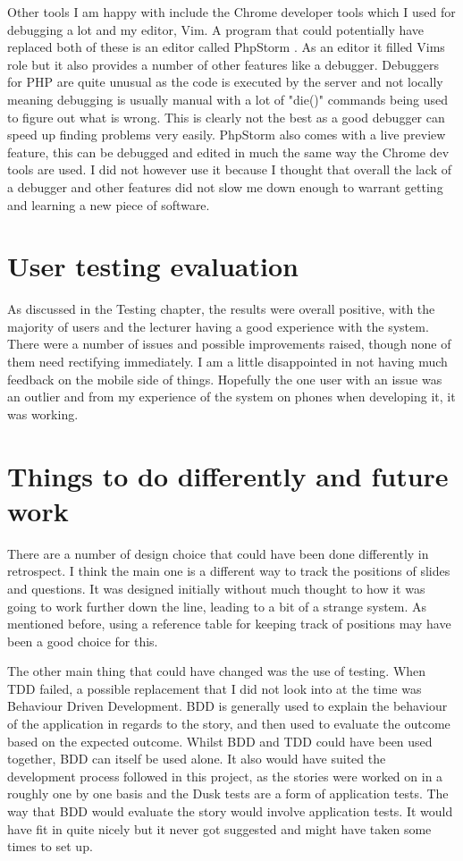 Other tools I am happy with include the Chrome developer tools which I used for debugging a lot and my editor, Vim. A program that could potentially have replaced both of these is an editor called PhpStorm \cite{phpstorm}. As an editor it filled Vims role but it also provides a number of other features like a debugger. Debuggers for PHP are quite unusual as the code is executed by the server and not locally meaning debugging is usually manual with a lot of "die()" commands being used to figure out what is wrong. This is clearly not the best as a good debugger can speed up finding problems very easily. PhpStorm also comes with a live preview feature, this can be debugged and edited in much the same way the Chrome dev tools are used. I did not however use it because I thought that overall the lack of a debugger and other features did not slow me down enough to warrant getting and learning a new piece of software.

\section{User testing evaluation}
As discussed in the Testing chapter, the results were overall positive, with the majority of users and the lecturer having a good experience with the system. There were a number of issues and possible improvements raised, though none of them need rectifying immediately. I am a little disappointed in not having much feedback on the mobile side of things. Hopefully the one user with an issue was an outlier and from my experience of the system on phones when developing it, it was working.

\section{Things to do differently and future work}
There are a number of design choice that could have been done differently in retrospect. I think the main one is a different way to track the positions of slides and questions. It was designed initially without much thought to how it was going to work further down the line, leading to a bit of a strange system. As mentioned before, using a reference table for keeping track of positions may have been a good choice for this.

The other main thing that could have changed was the use of testing. When TDD failed, a possible replacement that I did not look into at the time was Behaviour Driven Development\cite{bdd}. BDD is generally used to explain the behaviour of the application in regards to the story, and then used to evaluate the outcome based on the expected outcome. Whilst BDD and TDD could have been used together, BDD can itself be used alone. It also would have suited the development process followed in this project, as the stories were worked on in a roughly one by one basis and the Dusk tests are a form of application tests. The way that BDD would evaluate the story would involve application tests. It would have fit in quite nicely but it never got suggested and might have taken some times to set up.

